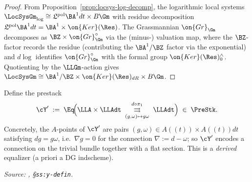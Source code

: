 \begin{proof}
  From Proposition~\ref{prop:locsys-log-decomp}, the logarithmic local
  systems $\LocSysGm_{\log} \cong \mathfrak{L}^{\mathrm{pol}}\BA^1 dt
  \times B\Gm$ with residue decomposition
  $\mathfrak{L}^{\mathrm{pol}}\BA^1 dt = \BA^1 \times \on{Ker}(\Res)$.
  The Grassmannian $\on{Gr}_{\Gm}$ decomposes as $\BZ \times \on{Gr}_{\Gm}^{\circ}$
  via the (minus-) valuation map, where the $\BZ$-factor records the
  residue (contributing the $\BA^1/\BZ$ factor via the exponential) and
  $d\log$ identifies $\on{Gr}_{\Gm}^{\circ}$ with the formal group
  $\on{Ker}(\Res)_0^{\wedge}$. Quotienting by the $\LLGm$-action gives
  $\LocSysGm \cong \BA^1/\BZ \times \on{Ker}(\Res)_{dR} \times B\Gm$.
\end{proof}

\begin{definition}
  \label{def:Y-prime}
  Define the prestack
  \[
    \cY' \;:=\; \Eq\!\Big(\LLA \times \LLAdt
    \;\underset{(g,\omega)\mapsto g\omega}{\overset{d \circ \pi_1}{\rightrightarrows}}\;
    \LLAdt\Big) \;\in\; \PreStk.
  \]
  Concretely, the $A$-points of $\cY'$ are pairs
  $(g, \omega) \in A((t)) \times A((t))dt$ satisfying $dg = g\omega$, i.e.\
  $\nabla g = 0$ for the connection $\nabla := d - \omega$; so $\cY'$ encodes
  a connection on the trivial bundle together with a flat section.
  This is a \emph{derived} equalizer (a priori a DG indscheme).

  \textit{Source: \cite{hilburn-raskin}, \S\texttt{ss:y-defin}.}
\end{definition}


